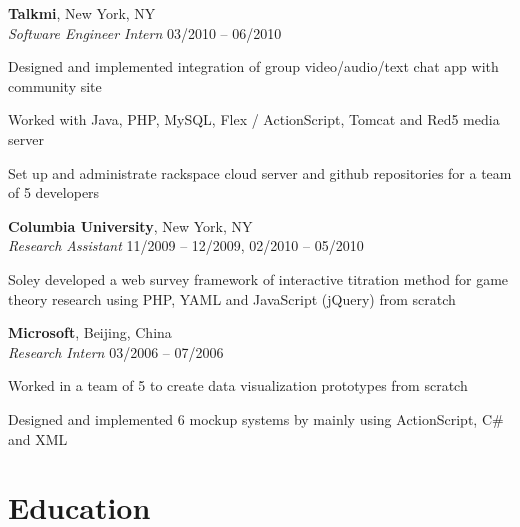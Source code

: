 \documentclass[margin,line]{resume}
\begin{document}
\begin{resume}
    \textbf{Talkmi}, New York, NY \\
    \textsl{Software Engineer Intern} \hfill 03/2010 -- 06/2010 \vspace{-3mm}\\\vspace{-1mm}%
      \begin{list2}
      \item Designed and implemented integration of group video/audio/text chat app with community site
      \item Worked with Java, PHP, MySQL, Flex / ActionScript, Tomcat and Red5 media server
      \item Set up and administrate rackspace cloud server and github repositories for a team of 5 developers
      \end{list2}

    \textbf{Columbia University}, New York, NY \\
    \textsl{Research Assistant} \hfill 11/2009 -- 12/2009, 02/2010 -- 05/2010 \vspace{-3mm}\\\vspace{-1mm}%
      \begin{list2} 
      \item Soley developed a web survey framework of interactive titration method for game theory research using PHP, YAML and JavaScript (jQuery) from scratch
      \end{list2}

    \textbf{Microsoft}, Beijing, China \\
    \textsl{Research Intern} \hfill 03/2006 -- 07/2006 \vspace{-3mm}\\\vspace{-1mm}%
      \begin{list2}
      \item Worked in a team of 5 to create data visualization prototypes from scratch
      \item Designed and implemented 6 mockup systems by mainly using ActionScript, C\# and XML 
      \end{list2}

    \section{\mysidestyle Education}


\end{resume}
\end{document}
